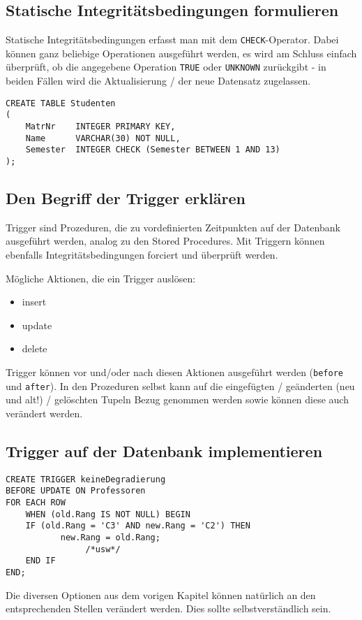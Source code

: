 \subsection{Statische Integritätsbedingungen formulieren}
Statische Integritätsbedingungen erfasst man mit dem \texttt{CHECK}-Operator. Dabei können ganz beliebige Operationen ausgeführt werden, es wird am Schluss einfach überprüft, ob die angegebene Operation \texttt{TRUE} oder \texttt{UNKNOWN} zurückgibt - in beiden Fällen wird die Aktualisierung / der neue Datensatz zugelassen.

\begin{lstlisting}[caption={Beispiel mit CHECK}]
CREATE TABLE Studenten
(
    MatrNr    INTEGER PRIMARY KEY,
    Name      VARCHAR(30) NOT NULL,
    Semester  INTEGER CHECK (Semester BETWEEN 1 AND 13)
);
\end{lstlisting}

\subsection{Den Begriff der Trigger erklären}
Trigger sind Prozeduren, die zu vordefinierten Zeitpunkten auf der Datenbank ausgeführt werden, analog zu den Stored Procedures. Mit Triggern können ebenfalls Integritätsbedingungen forciert und überprüft werden.

Mögliche Aktionen, die ein Trigger auslösen:

\begin{itemize}
  \item insert
  \item update
  \item delete
\end{itemize}

Trigger können vor und/oder nach diesen Aktionen ausgeführt werden (\texttt{before} und \texttt{after}). In den Prozeduren selbst kann auf die eingefügten / geänderten (neu und alt!) / gelöschten Tupeln Bezug genommen werden sowie können diese auch verändert werden.

\subsection{Trigger auf der Datenbank implementieren}

\begin{lstlisting}[caption={Trigger Beispiel SQL}]
CREATE TRIGGER keineDegradierung
BEFORE UPDATE ON Professoren
FOR EACH ROW
    WHEN (old.Rang IS NOT NULL) BEGIN
    IF (old.Rang = 'C3' AND new.Rang = 'C2') THEN
           new.Rang = old.Rang;
                /*usw*/
    END IF
END;
\end{lstlisting}

Die diversen Optionen aus dem vorigen Kapitel können natürlich an den entsprechenden Stellen verändert werden. Dies sollte selbstverständlich sein.